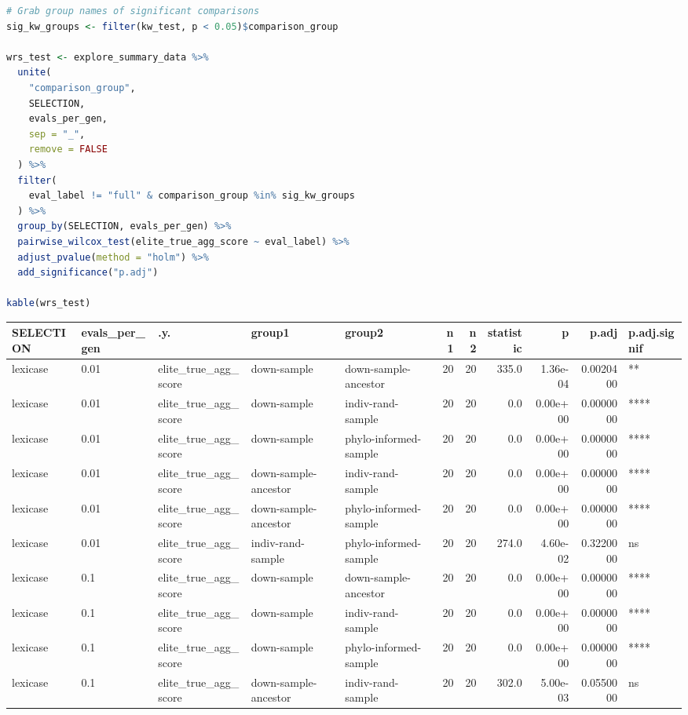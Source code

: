 \documentclass[
]{book}
\begin{document}
\begin{lstlisting}[language=R]
# Grab group names of significant comparisons
sig_kw_groups <- filter(kw_test, p < 0.05)$comparison_group

wrs_test <- explore_summary_data %>%
  unite(
    "comparison_group",
    SELECTION,
    evals_per_gen,
    sep = "_",
    remove = FALSE
  ) %>%
  filter(
    eval_label != "full" & comparison_group %in% sig_kw_groups
  ) %>%
  group_by(SELECTION, evals_per_gen) %>%
  pairwise_wilcox_test(elite_true_agg_score ~ eval_label) %>%
  adjust_pvalue(method = "holm") %>%
  add_significance("p.adj")

kable(wrs_test)
\end{lstlisting}

\begin{tabular}{l|l|l|l|l|r|r|r|r|r|l}
\hline
SELECTION & evals\_per\_gen & .y. & group1 & group2 & n1 & n2 & statistic & p & p.adj & p.adj.signif\\
\hline
lexicase & 0.01 & elite\_true\_agg\_score & down-sample & down-sample-ancestor & 20 & 20 & 335.0 & 1.36e-04 & 0.0020400 & **\\
\hline
lexicase & 0.01 & elite\_true\_agg\_score & down-sample & indiv-rand-sample & 20 & 20 & 0.0 & 0.00e+00 & 0.0000000 & ****\\
\hline
lexicase & 0.01 & elite\_true\_agg\_score & down-sample & phylo-informed-sample & 20 & 20 & 0.0 & 0.00e+00 & 0.0000000 & ****\\
\hline
lexicase & 0.01 & elite\_true\_agg\_score & down-sample-ancestor & indiv-rand-sample & 20 & 20 & 0.0 & 0.00e+00 & 0.0000000 & ****\\
\hline
lexicase & 0.01 & elite\_true\_agg\_score & down-sample-ancestor & phylo-informed-sample & 20 & 20 & 0.0 & 0.00e+00 & 0.0000000 & ****\\
\hline
lexicase & 0.01 & elite\_true\_agg\_score & indiv-rand-sample & phylo-informed-sample & 20 & 20 & 274.0 & 4.60e-02 & 0.3220000 & ns\\
\hline
lexicase & 0.1 & elite\_true\_agg\_score & down-sample & down-sample-ancestor & 20 & 20 & 0.0 & 0.00e+00 & 0.0000000 & ****\\
\hline
lexicase & 0.1 & elite\_true\_agg\_score & down-sample & indiv-rand-sample & 20 & 20 & 0.0 & 0.00e+00 & 0.0000000 & ****\\
\hline
lexicase & 0.1 & elite\_true\_agg\_score & down-sample & phylo-informed-sample & 20 & 20 & 0.0 & 0.00e+00 & 0.0000000 & ****\\
\hline
lexicase & 0.1 & elite\_true\_agg\_score & down-sample-ancestor & indiv-rand-sample & 20 & 20 & 302.0 & 5.00e-03 & 0.0550000 & ns\\

\end{tabular}
\end{document}
